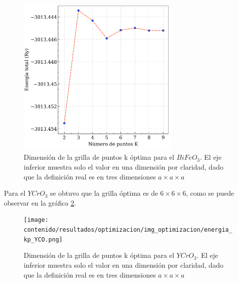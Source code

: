 \begin{figure}[H]
    \centering
    \includegraphics[width=0.7\textwidth]{contenido/resultados/optimizacion/img_optimizacion/energia_kp_BFO.png}
    \caption[Dimensi\'on de la grilla de puntos k $BiFeO_{3}$]{Dimensi\'on de 
    la grilla de puntos k \'optima para el $BiFeO_{3}$. El eje inferior muestra 
    solo el valor en una dimensi\'on por claridad, dado que la definici\'on 
    real es en tres dimensiones $a \times a \times a$}
    \label{puntos_k_BFO}
\end{figure}

\noindent Para el $YCrO_{3}$ se obtuvo que la grilla \'optima es de $6 \times 6 
\times 6$, 
como se puede observar en la gr\'afica \ref{puntos_k_YCO}.

\begin{figure}[H]
    \centering
    \texttt{[image: contenido/resultados/optimizacion/img\_optimizacion/energia\_kp\_YCO.png]}
    \caption[Dimensi\'on de la grilla de puntos k $YCrO_{3}$]{Dimensi\'on de 
        la grilla de puntos k \'optima para el $YCrO_{3}$. El eje inferior 
        muestra solo el valor en una dimensi\'on por claridad, dado que la 
        definici\'on real es en tres dimensiones $a \times a \times a$}
    \label{puntos_k_YCO}
\end{figure}
